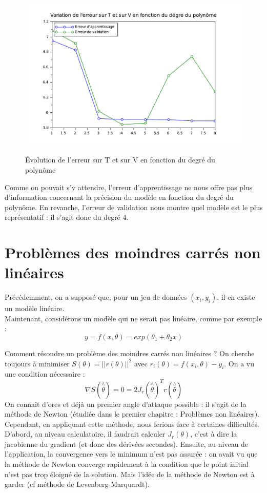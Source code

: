 \documentclass[a4paper,10pt]{report}
\begin{document}
\begin{figure}[H]
\centering
\caption{Évolution de l'erreur sur T et sur V en fonction du degré du polynôme}
\includegraphics[width=12cm]{erreur_validation.pdf}
\label{erreur_validation}
\end{figure}

Comme on pouvait s'y attendre, l'erreur d'apprentissage ne nous offre pas plus d'information concernant la précision du modèle en fonction du degré du polynôme. En revanche, l'erreur de validation nous montre quel modèle est le plus représentatif : il s'agit donc du degré 4.


\section{Problèmes des moindres carrés non linéaires}
Précédemment, on a supposé que, pour un jeu de données $(x_i,y_i)$, il en existe un modèle linéaire.\\
Maintenant, considérons un modèle qui ne serait pas linéaire, comme par exemple :
\abovedisplayskip=0mm
\begin{displaymath}
y=f(x,\theta) = exp(\theta_1 + \theta_2x)
\end{displaymath}

Comment résoudre un problème des moindres carrés non linéaires ? On cherche toujours à minimiser $S(\theta) = ||r(\theta)||^2$ avec $r_i(\theta)=f(x_i,\theta)-y_i$. On a vu une condition nécessaire : 
\abovedisplayskip=0mm
\begin{displaymath}
\nabla S(\overset{\wedge}{\theta})=0=2J_r(\overset{\wedge}{\theta})^Tr(\overset{\wedge}{\theta})
\end{displaymath}
On connaît d'ores et déjà un premier angle d'attaque possible : il s'agit de la méthode de Newton (étudiée dans le premier chapitre : Problèmes non linéaires). Cependant, en appliquant cette méthode, nous ferions face à certaines difficultés. D'abord, au niveau calculatoire, il faudrait calculer $J_r(\theta)$, c'est à dire la jacobienne du gradient (et donc des dérivées secondes). Ensuite, au niveau de l'application, la convergence vers le minimum n'est pas assurée : on avait vu que la méthode de Newton converge rapidement à la condition que le point initial n'est pas trop éloigné de la solution. Mais l'idée de la méthode de Newton est à garder (cf méthode de Levenberg-Marquardt).
\end{document}
